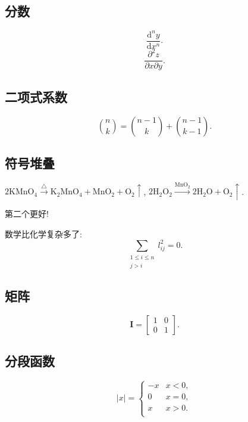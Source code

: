 \documentclass{ctexart}
\begin{document}
    \subsection{分数}
    \begin{equation*}
        \frac{\mathrm{d}^{n}y}{\mathrm{d}x^{n}}.
    \end{equation*}
    \begin{equation*}
        \frac{\partial^{2}z}{\partial{x}\partial{y}}.
    \end{equation*}
    \subsection{二项式系数}
    \begin{equation*}
        \binom{n}{k} = \binom{n-1}{k} + \binom{n-1}{k-1}.
    \end{equation*}
    \subsection{符号堆叠}
    $ 2\text{K}\text{Mn}\text{O}_4 \stackrel{\triangle}{\longrightarrow}
      \text{K}_2\text{Mn}\text{O}_4+\text{Mn}\text{O}_2+\text{O}_2\uparrow $,
    $ 2\text{H}_2\text{O}_2 \xrightarrow[]{\text{Mn}\text{O}_2}
    2\text{H}_2\text{O}+\text{O}_2\uparrow $.

    第二个更好!

    数学比化学复杂多了:
    \begin{equation*}
        \sum_{\substack{1\le{i}\le{n}\\j>i}} l_{ij}^2 = 0.
    \end{equation*}
    \subsection{矩阵}
    \begin{equation*}
        \boldsymbol{I} = 
        \begin{bmatrix}
            1 & 0 \\
            0 & 1
        \end{bmatrix}.
    \end{equation*}
    \subsection{分段函数}
    \begin{equation*}
        |x| = 
        \begin{cases}
            -x & x < 0, \\
             0 & x = 0, \\
             x & x > 0. \\
        \end{cases}
    \end{equation*}
\end{document}
